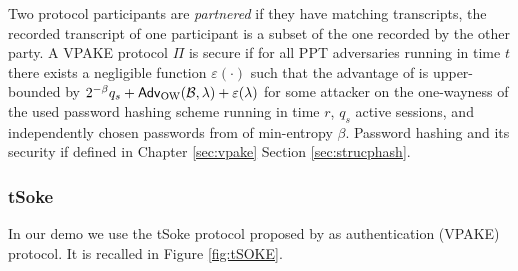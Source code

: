 \noindent
Two protocol participants are \emph{partnered} if they have matching transcripts, \ie the recorded transcript of one participant is a subset of the one recorded by the other party.
A \ac{VPAKE} protocol $\Pi$ is secure if for all \ac{PPT} adversaries \cA running in time $t$ there exists a negligible function $\varepsilon(\cdot)$ such that the advantage of \cA is upper-bounded by
$2^{-\beta}q_s + \mathsf{Adv}_{\text{OW}}(\mathcal{B}, \lambda) + \varepsilon(\lambda)$
for some attacker \cB on the one-wayness of the used password hashing scheme running in time $r$, $q_s$ active sessions, and independently chosen passwords from \cD of min-entropy $\beta$.
Password hashing and its security if defined in Chapter \ref{sec:vpake} Section \ref{sec:strucphash}.


\subsubsection{tSoke} \label{sec:tsoke}
In our demo we use the tSoke protocol proposed by \citet{Manulis2014} as authentication (\ac{VPAKE}) protocol.
It is recalled in Figure \ref{fig:tSOKE}.

